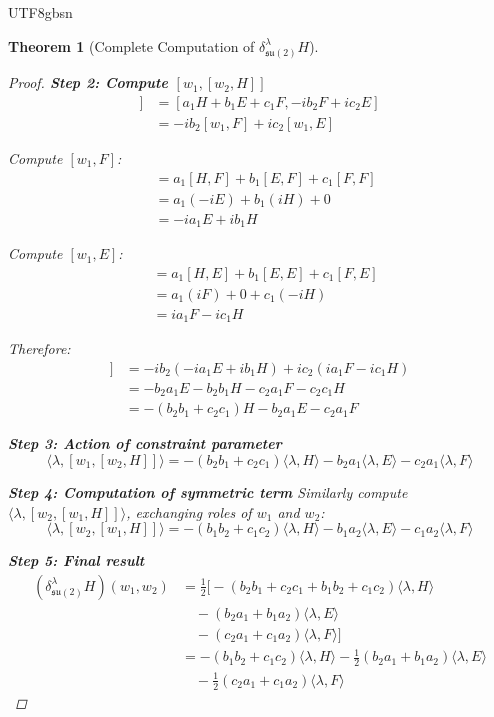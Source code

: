 \documentclass[a4paper,12pt]{extarticle}
\newtheorem{theorem}{Theorem}[section]
\theoremstyle{definition}
\begin{document}
\begin{CJK}{UTF8}{gbsn}
\begin{theorem}[Complete Computation of $\delta^\lambda_{\mathfrak{su}(2)}H$]
\begin{proof}
\textbf{Step 2: Compute $[w_1, [w_2, H]]$}
\begin{align}
[w_1, [w_2, H]] &= [a_1 H + b_1 E + c_1 F, -ib_2 F + ic_2 E]\\
&= -ib_2[w_1, F] + ic_2[w_1, E]
\end{align}

Compute $[w_1, F]$:
\begin{align}
[w_1, F] &= a_1[H, F] + b_1[E, F] + c_1[F, F]\\
&= a_1(-iE) + b_1(iH) + 0\\
&= -ia_1 E + ib_1 H
\end{align}

Compute $[w_1, E]$:
\begin{align}
[w_1, E] &= a_1[H, E] + b_1[E, E] + c_1[F, E]\\
&= a_1(iF) + 0 + c_1(-iH)\\
&= ia_1 F - ic_1 H
\end{align}

Therefore:
\begin{align}
[w_1, [w_2, H]] &= -ib_2(-ia_1 E + ib_1 H) + ic_2(ia_1 F - ic_1 H)\\
&= -b_2 a_1 E - b_2 b_1 H - c_2 a_1 F - c_2 c_1 H\\
&= -(b_2 b_1 + c_2 c_1)H - b_2 a_1 E - c_2 a_1 F
\end{align}

\textbf{Step 3: Action of constraint parameter}
$$\langle \lambda, [w_1, [w_2, H]] \rangle = -(b_2 b_1 + c_2 c_1)\langle\lambda, H\rangle - b_2 a_1\langle\lambda, E\rangle - c_2 a_1\langle\lambda, F\rangle$$

\textbf{Step 4: Computation of symmetric term}
Similarly compute $\langle \lambda, [w_2, [w_1, H]] \rangle$, exchanging roles of $w_1$ and $w_2$:
$$\langle \lambda, [w_2, [w_1, H]] \rangle = -(b_1 b_2 + c_1 c_2)\langle\lambda, H\rangle - b_1 a_2\langle\lambda, E\rangle - c_1 a_2\langle\lambda, F\rangle$$

\textbf{Step 5: Final result}
\begin{align}
(\delta^\lambda_{\mathfrak{su}(2)}H)(w_1, w_2) &= \frac{1}{2}\Big[-(b_2 b_1 + c_2 c_1 + b_1 b_2 + c_1 c_2)\langle\lambda, H\rangle\\
&\quad - (b_2 a_1 + b_1 a_2)\langle\lambda, E\rangle\\
&\quad - (c_2 a_1 + c_1 a_2)\langle\lambda, F\rangle\Big]\\
&= -(b_1 b_2 + c_1 c_2)\langle\lambda, H\rangle - \frac{1}{2}(b_2 a_1 + b_1 a_2)\langle\lambda, E\rangle\\
&\quad - \frac{1}{2}(c_2 a_1 + c_1 a_2)\langle\lambda, F\rangle
\end{align}
\end{proof}
\end{theorem}


\end{CJK}
\end{document}
